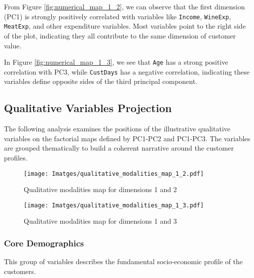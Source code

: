 From Figure \ref{fig:numerical_map_1_2}, we can observe that the first dimension (PC1) is strongly positively correlated with variables like \texttt{Income}, \texttt{WineExp}, \texttt{MeatExp}, and other expenditure variables. Most variables point to the right side of the plot, indicating they all contribute to the same dimension of customer value.

In Figure \ref{fig:numerical_map_1_3}, we see that \texttt{Age} has a strong positive correlation with PC3, while \texttt{CustDays} has a negative correlation, indicating these variables define opposite sides of the third principal component.

\newpage
\subsection{Qualitative Variables Projection}

The following analysis examines the positions of the illustrative qualitative variables on the factorial maps defined by PC1-PC2 and PC1-PC3. The variables are grouped thematically to build a coherent narrative around the customer profiles.

\begin{figure}[H]
    \centering
    \texttt{[image: Imatges/qualitative\_modalities\_map\_1\_2.pdf]}
    \caption{Qualitative modalities map for dimensions 1 and 2}
    \label{fig:qualitative_map_1_2}
\end{figure}

\begin{figure}[H]
    \centering
    \texttt{[image: Imatges/qualitative\_modalities\_map\_1\_3.pdf]}
    \caption{Qualitative modalities map for dimensions 1 and 3}
    \label{fig:qualitative_map_1_3}
\end{figure}

\newpage
\subsubsection{Core Demographics}

This group of variables describes the fundamental socio-economic profile of the customers.

